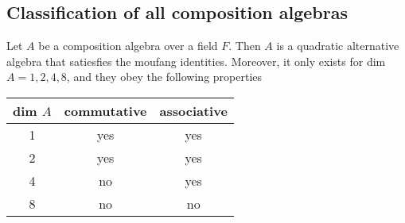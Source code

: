 \documentclass[../Thesis.tex]{subfiles}
\begin{document}
\subsection{Classification of all composition algebras}
\begin{theorem}
Let $A$ be a composition algebra over a field $F$. Then $A$ is a quadratic alternative algebra that satiesfies the moufang identities. Moreover, it only exists for dim $A = 1,2,4,8$, and they obey the following properties
\begin{center}

\begin{tabular}{c|c|c}
dim $A$ & commutative & associative\\
\hline
1 & yes & yes\\
2 & yes & yes\\
4 & no & yes\\
8 & no & no
\end{tabular}
\end{center}
\end{theorem}
\end{document}
